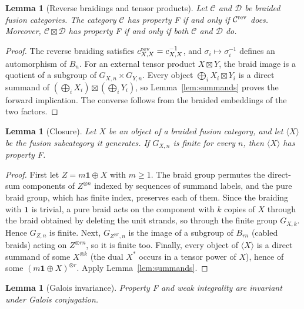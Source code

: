\documentclass[11pt,oneside]{amsart}
\newtheorem{lemma}[theorem]{Lemma}
\theoremstyle{remark}
\newcommand{\C}{\mathcal C}
\newcommand{\D}{\mathcal D}
\newcommand{\one}{\mathbf 1}
\begin{document}
\begin{lemma}[Reverse braidings and tensor products]\label{lem:products}
Let $\C$ and $\D$ be braided fusion categories. The category $\C$ has property F
if and only if $\C^{\rm rev}$ does. Moreover, $\C\boxtimes\D$ has property F
if and only if both $\C$ and $\D$ do.
\end{lemma}

\begin{proof}
The reverse braiding satisfies $c^{\rm rev}_{X,X}=c_{X,X}^{-1}$, and
$\sigma_i\mapsto\sigma_i^{-1}$ defines an automorphism of $B_n$. For an external
tensor product $X\boxtimes Y$, the braid image is a quotient of a subgroup of
$G_{X,n}\times G_{Y,n}$. Every object
$\bigoplus_iX_i\boxtimes Y_i$ is a direct summand of
$(\bigoplus_iX_i)\boxtimes(\bigoplus_iY_i)$, so Lemma~\ref{lem:summands}
proves the forward implication. The converse follows from the braided
embeddings of the two factors.
\end{proof}

\begin{lemma}[Closure]\label{lem:closure}
Let $X$ be an object of a braided fusion category, and let $\langle X\rangle$ be
the fusion subcategory it generates. If $G_{X,n}$ is finite for every $n$, then
$\langle X\rangle$ has property F.
\end{lemma}

\begin{proof}
First let $Z=m\one\oplus X$ with $m\ge1$. The braid group permutes the direct-sum
components of $Z^{\otimes n}$ indexed by sequences of summand labels, and the
pure braid group, which has finite index, preserves each of them. Since the
braiding with $\one$ is trivial, a pure braid acts on the component with $k$
copies of $X$ through the braid obtained by deleting the unit strands, so through
the finite group $G_{X,k}$. Hence $G_{Z,n}$ is finite. Next, $G_{Z^{\otimes r},n}$
is the image of a subgroup of $B_{rn}$ (cabled braids) acting on
$Z^{\otimes rn}$, so it is finite too. Finally, every object of $\langle X\rangle$
is a direct summand of some $X^{\otimes k}$ (the dual $X^*$ occurs in a tensor
power of $X$), hence of some $(m\one\oplus X)^{\otimes r}$. Apply
Lemma~\ref{lem:summands}.
\end{proof}

\begin{lemma}[Galois invariance]\label{lem:galois-transfer}
Property F and weak integrality are invariant under Galois conjugation.
\end{lemma}
\end{document}

